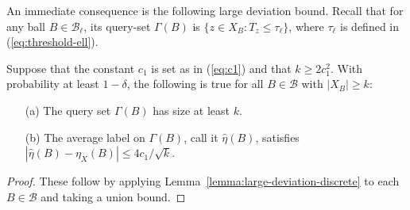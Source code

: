 \documentclass[anon,12pt]{colt2022} %
\def\B{{\mathcal B}}
\begin{document}
An immediate consequence is the following large deviation bound. Recall that for any ball $B \in \B_\ell$, its query-set $\Gamma(B)$ is $\{z \in X_B: T_z \leq \tau_\ell\}$, where $\tau_\ell$ is defined in (\ref{eq:threshold-ell}).
\begin{lemma}
Suppose that the constant $c_1$ is set as in (\ref{eq:c1}) and that $k \geq 2c_1^2$. With probability at least $1-\delta$, the following is true for all $B \in \B$ with $|X_B| \geq k$:
\begin{enumerate}
\item[(a)] The query set $\Gamma(B)$ has size at least $k$.
\item[(b)] The average label on $\Gamma(B)$, call it $\widehat{\eta}(B)$, satisfies
$\left| \widehat{\eta}(B) - \eta_X(B) \right| \leq 4c_1/\sqrt{k}$.
\end{enumerate}
\label{lemma:large-deviation-bounds}
\end{lemma}
\begin{proof}
These follow by applying Lemma~\ref{lemma:large-deviation-discrete} to each $B \in \B$ and taking a union bound. 
\end{proof}
\end{document}
